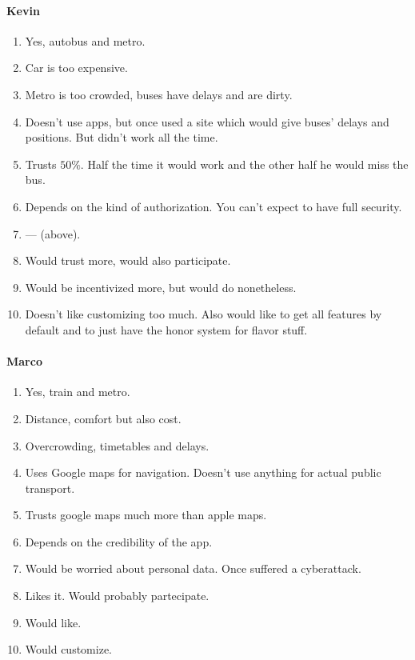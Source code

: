 \documentclass[a4paper, 10pt]{article}
\begin{document}
\paragraph*{Kevin}
\begin{enumerate}
    \item Yes, autobus and metro.
    \item Car is too expensive.
    \item Metro is too crowded, buses have delays and are dirty.
    \item Doesn't use apps, but once used a site which would give buses' delays and positions. But didn't work all the time.
    \item Trusts $50\%$. Half the time it would work and the other half he would miss the bus.
    \item Depends on the kind of authorization. You can't expect to have full security.
    \item --- (above).
    \item Would trust more, would also participate.
    \item Would be incentivized more, but would do nonetheless.
    \item Doesn't like customizing too much. Also would like to get all features by default and to just have the honor system for flavor stuff.
\end{enumerate}


\paragraph*{Marco}
\begin{enumerate}
    \item Yes, train and metro.
    \item Distance, comfort but also cost.
    \item Overcrowding, timetables and delays.
    \item Uses Google maps for navigation. Doesn't use anything for actual public transport.
    \item Trusts google maps much more than apple maps.
    \item Depends on the credibility of the app.
    \item Would be worried about personal data. Once suffered a cyberattack.
    \item Likes it. Would probably partecipate.
    \item Would like.
    \item Would customize.
\end{enumerate}
\end{document}
